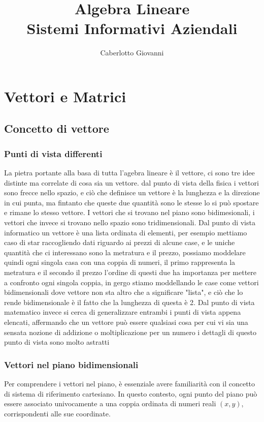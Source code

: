 \documentclass{report}
\title{\Huge{Algebra Lineare}\\Sistemi Informativi Aziendali}
\author{\huge{Caberlotto Giovanni}}
\date{}
\begin{document}
\maketitle
\newpage%
\tableofcontents
\pagebreak

\chapter{Vettori e Matrici} %
\label{chap:Vettori e Matrici}

\section{Concetto di vettore}
\subsection{Punti di vista differenti}

La pietra portante alla basa di tutta l'agebra lineare è il vettore, ci sono tre idee distinte ma correlate di cosa sia un vettore. dal punto di vista della fisica i vettori sono frecce nello spazio, e ciò che definisce un vettore è la lunghezza e la direzione in cui punta, ma fintanto che queste due quantità sono le stesse lo si può spostare e rimane lo stesso vettore. I vettori che si trovano nel piano sono bidimesionali, i vettori che invece si trovano nello spazio sono tridimensionali. Dal punto di vista informatico un vettore è una lista ordinata di elementi, per esempio mettiamo caso di star raccogliendo dati riguardo ai prezzi di alcune case, e le uniche quantità che ci interessano sono la metratura e il prezzo, possiamo moddelare quindi ogni singola casa con una coppia di numeri, il primo rappresenta la metratura e il secondo il prezzo l'ordine di questi due ha importanza per mettere a confronto ogni singola coppia, in gergo stiamo moddellando le case come vettori bidimensionali dove vettore non sta altro che a significare "lista", e ciò che lo rende bidimensionale è il fatto che la lunghezza di questa è 2. Dal punto di vista matematico invece si cerca di generalizzare entrambi i punti di vista appena elencati, affermando che un vettore può essere qualsiasi cosa per cui vi sia una sensata nozione di addizione o moltiplicazione per un numero i dettagli di questo punto di vista sono molto astratti

\subsection{Vettori nel piano bidimensionali}
Per comprendere i vettori nel piano, è essenziale avere familiarità con il concetto di sistema di riferimento cartesiano. In questo contesto, ogni punto del piano può essere associato univocamente a una coppia ordinata di numeri reali $(x, y)$, corrispondenti alle sue coordinate.
\end{document}
